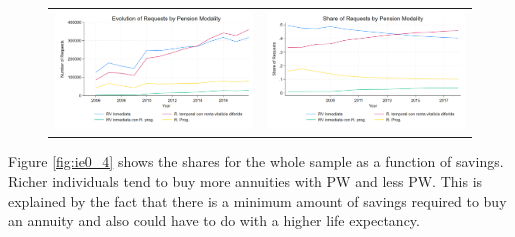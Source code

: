 \documentclass[12pt]{article}
\begin{document}
\begin{figure}[H]
\caption{}
 \label{fig:ie0_2and3}
\centering{}%
\begin{tabular}{cc}
\includegraphics[scale=0.27]{figures/IE0_plot2.png} & \includegraphics[scale=0.27]{figures/IE0_plot3.png}
\end{tabular}
\end{figure}


Figure \ref{fig:ie0_4} shows the shares for the whole sample as a function of savings. Richer individuals tend to buy more annuities with PW and less PW. This is explained by the fact that there is a minimum amount of savings required to buy an annuity and also could have to do with a higher life expectancy. 
\end{document}
